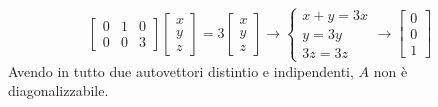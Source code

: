 \begin{exmp}
\begin{equation*}
\begin{bmatrix}
            0 & 1 & 0 \\
            0 & 0 & 3
        \end{bmatrix}
        \begin{bmatrix}
            x \\ y \\ z
        \end{bmatrix} =
        3
        \begin{bmatrix}
            x \\ y \\ z
        \end{bmatrix} \longrightarrow
        \begin{cases}
            x+y=3x \\
            y=3y \\
            3z=3z
        \end{cases} \longrightarrow
        \begin{bmatrix}
            0 \\ 0 \\ 1
        \end{bmatrix}
    \end{equation*}
    Avendo in tutto due autovettori distintio e indipendenti, $A$ non è diagonalizzabile.
\end{exmp}